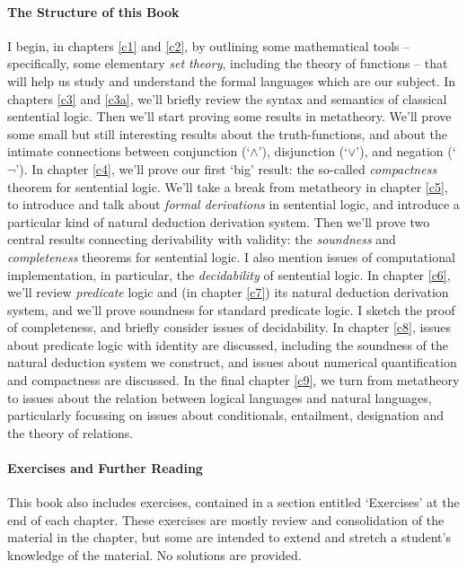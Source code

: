 \documentclass[openany,leqno,11pt,draft]{book}
\theoremstyle{break}
\theoremstyle{definition}
\theoremstyle{remark}
\begin{document}
\paragraph{The Structure of this Book} I begin, in chapters \ref{c1} and \ref{c2}, by outlining some mathematical tools – specifically, some elementary \emph{set theory}, including the theory of functions – that will help us study and understand the formal languages which are our subject. In chapters \ref{c3} and \ref{c3a}, we'll briefly review the syntax and semantics of classical sentential logic. Then we'll start proving some results in metatheory. We'll prove some small but still interesting results about the truth-functions, and about the intimate connections between conjunction (‘$\wedge$’), disjunction (‘$\vee$’), and negation (‘$¬$’). In chapter \ref{c4}, we'll prove our first `big' result: the so-called \emph{compactness} theorem for sentential logic. We'll take a break from metatheory in chapter \ref{c5}, to introduce and talk about \emph{formal derivations} in sentential logic, and introduce a particular kind of natural deduction derivation system. Then we'll prove two central results connecting derivability with validity: the \emph{soundness} and \emph{completeness} theorems for sentential logic. I also mention issues of computational implementation, in particular, the \emph{decidability} of sentential logic.
In chapter \ref{c6}, we'll review \emph{predicate} logic and (in chapter \ref{c7}) its natural deduction derivation system, and we'll prove soundness for standard predicate logic. I sketch the proof of completeness, and briefly consider issues of decidability. In chapter \ref{c8}, issues about predicate logic with identity are discussed, including the soundness of the natural deduction system we construct, and issues about numerical quantification and compactness are discussed. In the final chapter \ref{c9}, we turn from metatheory to issues about the relation between logical languages and natural languages, particularly focussing on issues about conditionals, entailment, designation and the theory of relations.

\paragraph{Exercises and Further Reading} This book also includes exercises, contained in a section entitled `Exercises' at the end of each chapter. These exercises are mostly review and consolidation of the material in the chapter, but some are intended to extend and stretch a student's knowledge of the material. No solutions are provided.
\end{document}
